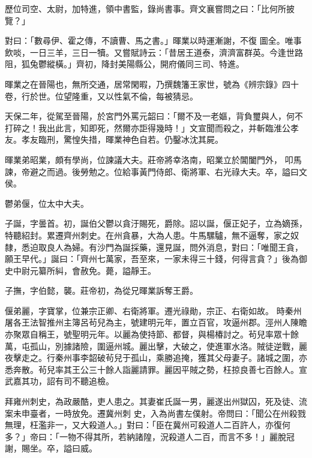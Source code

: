 \begin{pinyinscope}
 歷位司空、太尉，加特進，領中書監，錄尚書事。齊文襄嘗問之曰：「比何所披覽？」



 對曰：「數尋伊、霍之傳，不讀曹、馬之書。」暉業以時運漸謝，不復
 圖全。唯事飲啖，一日三羊，三日一犢。又嘗賦詩云：「昔居王道泰，濟濟富群英。今逢世路阻，狐兔鬱縱橫。」齊初，降封美陽縣公，開府儀同三司、特進。



 暉業之在晉陽也，無所交通，居常閑暇，乃撰魏籓王家世，號為《辨宗錄》四十卷，行於世。位望隆重，又以性氣不倫，每被猜忌。



 天保二年，從駕至晉陽，於宮門外罵元韶曰：「爾不及一老嫗，背負璽與人，何不打碎之！我出此言，知即死，然爾亦詎得幾時！」文宣聞而殺之，并斬臨淮公孝友。孝友臨刑，驚惶失措，暉業神色自若。仍鑿冰沈其屍。



 暉業弟昭業，頗有學尚，位諫議大夫。莊帝將幸洛南，昭業立於閶闔門外，
 叩馬諫，帝避之而過。後勞勉之。位給事黃門侍郎、衛將軍、右光祿大夫。卒，謚曰文侯。



 鬱弟偃，位太中大夫。



 子誕，字曇首。初，誕伯父鬱以貪汙賜死，爵除。詔以誕，偃正妃子，立為嫡孫，特聽紹封。累遷齊州刺史。在州貪暴，大為人患。牛馬騾驢，無不逼奪，家之奴隸，悉迫取良人為婦。有沙門為誕採藥，還見誕，問外消息，對曰：「唯聞王貪，願王早代。」誕曰：「齊州七萬家，吾至來，一家未得三十錢，何得言貪？」後為御史中尉元纂所糾，會赦免。薨，謚靜王。



 子撫，字伯懿，襲。莊帝初，為從兄暉業訴奪王爵。



 偃弟麗，字寶掌，位兼宗正卿、右衛將軍。遷光祿勛，宗正、右衛如故。
 時秦州屠各王法智推州主簿呂茍兒為主，號建明元年，置立百官，攻逼州郡。涇州人陳瞻亦聚眾自稱王，號聖明元年。以麗為使持節、都督，與楊椿討之。茍兒率眾十餘萬，屯孤山，別據諸險，圍逼州城。麗出擊，大破之，使進軍水洛。賊徒逆戰，麗夜擊走之。行秦州事李韶破茍兒于孤山，乘勝追掩，獲其父母妻子。諸城之圍，亦悉奔散。茍兒率其王公三十餘人詣麗請罪。麗因平賊之勢，枉掠良善七百餘人。宣武嘉其功，詔有司不聽追檢。



 拜雍州刺史，為政嚴酷，吏人患之。其妻崔氏誕一男，麗遂出州獄囚，死及徒、流案未申臺者，一時放免。遷冀州刺
 史，入為尚書左僕射。帝問曰：「聞公在州殺戮無理，枉濫非一，又大殺道人。」對曰：「臣在冀州可殺道人二百許人，亦復何多？」帝曰：「一物不得其所，若納諸隍，況殺道人二百，而言不多！」麗脫冠謝，賜坐。卒，謚曰威。




\end{pinyinscope}

